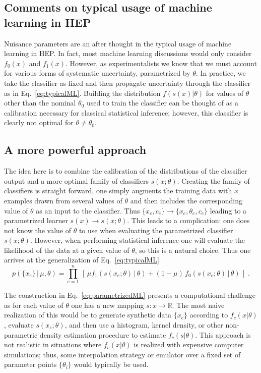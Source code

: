 \documentclass[11pt, oneside]{article}   	%
\begin{document}
\subsection{Comments on typical usage of machine learning in HEP}

Nuisance parameters are an after thought in the typical usage of machine learning in HEP. In fact, most machine learning discussions would only consider $f_0(x)$ and $f_1(x)$. However, as experimentalists we know that we must account for various forms of systematic uncertainty, parametrized by $\theta$. In practice, we take the classifier as fixed and then propagate uncertainty through the classifier as in Eq.~\ref{eq:typicalML}. Building the distribution $f(s(x)|\theta)$ for values of $\theta$ other than the nominal $\theta_0$ used to train the classifier can be thought of as a calibration necessary for classical statistical inference; however, this classifier is clearly not optimal for $\theta \ne \theta_0$.

\subsection{A more powerful  approach}

The idea here is to combine the calibration of the distributions of the classifier output and a more optimal family of classifiers $s(x; \theta)$. Creating the family of classifiers is straight forward, one simply augments the training data with $x$ examples drawn from several values of $\theta$ and then includes the corresponding value of $\theta$ as an input to the classifier. Thus $\{x_e,c_e\} \to \{x_e,\theta_e, c_e\}$ leading to a parametrized learner $s(x)\to s(x;\theta)$. This leads to a complication: one does not know the value of $\theta$ to use when evaluating the parametrized classifier $s(x;\theta)$.  However, when performing statistical inference one will evaluate the likelihood of the data at a given value of $\theta$, so this is a natural choice.  Thus one arrives at the generalization of Eq.~\ref{eq:typicalML}
\begin{equation}\label{eq:parametrizedML}
p( \{ x_e \} \,|\, \mu, \theta) = \prod_{e=1}^n \, \left[\, \mu f_1( s(x_e;\theta) \, |\,  \theta)  + (1-\mu)\, f_0( s(x_e;\theta) \,|\, \theta) \,\right] \; .
\end{equation}

The construction in Eq.~\ref{eq:parametrizedML} presents a computational challenge as for each value of $\theta$ one has a new mapping $s: x\to\mathbb{R}$. The most naive realization of this would be to generate synthetic data $\{x_e\}$ according to $f_c(x|\theta)$, evaluate $s(x_e ; \theta)$, and then use a histogram, kernel density, or other non-parametric density estimation procedure to estimate $f_c( s | \theta)$. This approach is not realistic in situations where $f_c(x|\theta)$ is realized with expensive computer simulations; thus, some interpolation strategy or emulator over a fixed set of parameter points $\{\theta_i\}$ would typically be used.
\end{document}
